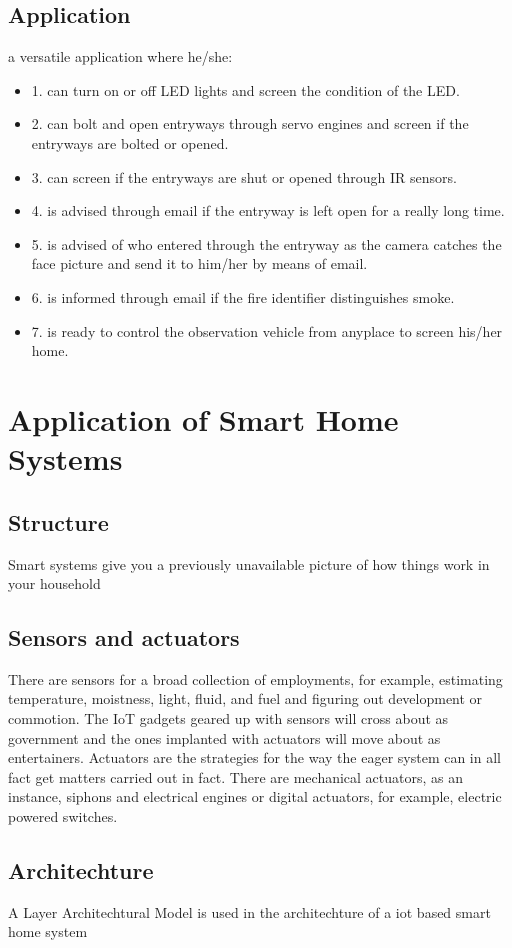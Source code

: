 \documentclass{article}
\begin{document}
\subsection{Application}
a versatile application
where he/she:
\begin{itemize}
    \item 1. can turn on or off LED lights and screen the
condition of the LED.
    \item 2. can bolt and open entryways through servo engines
and screen if the entryways are bolted or opened.
    \item 3. can screen if the entryways are shut or opened
through IR sensors.
    \item 4. is advised through email if the entryway is left open for a really long time.
    \item 5. is advised of who entered through the entryway as
the camera catches the face picture and send it to him/her by
means of email.
    \item 6. is informed through email if the fire identifier
distinguishes smoke.
    \item 7. is ready to control the observation vehicle from
anyplace to screen his/her home.
\end{itemize}
\section{Application of Smart Home Systems}
\subsection{Structure}
Smart systems give you a previously unavailable picture of how things work in your household
\subsection{Sensors and actuators}
There are sensors for a broad collection of
employments, for example, estimating temperature,
moistness, light, fluid, and fuel and figuring out development
or commotion.
The IoT gadgets geared up with sensors
will cross about as government and the ones implanted with
actuators will move about as entertainers.
Actuators are the strategies for the way the
eager system can in all fact get matters carried out in fact.
There are mechanical actuators, as an instance, siphons and
electrical engines or digital actuators, for example, electric
powered switches.
\subsection{Architechture}
A Layer Architechtural Model is used in the architechture of a iot based smart home system
\end{document}
